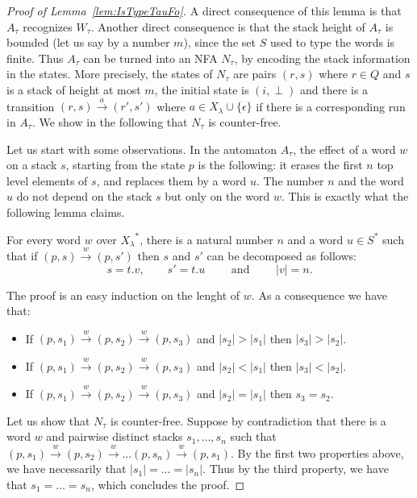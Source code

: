 \begin{proof}[Proof of Lemma~\ref{lem:IsTypeTauFo}]
A direct consequence of this lemma is that $A_\tau$ recognizes $W_\tau$. Another direct consequence is that the stack height of $A_\tau$ is bounded (let us say by a number $m$), since the set $S$ used to type the words is finite. Thus $A_\tau$ can be turned into an NFA $N_\tau$, by encoding the stack information in the states. More precisely, the states of $N_\tau$ are pairs $(r,s)$ where $r\in Q$ and $s$ is a stack of height at most $m$, the initial state is $(i,\perp)$ and there is a transition $(r,s)\xrightarrow{a}(r',s')$ where $a\in X_\lambda\cup\{\epsilon\}$ if there is a corresponding run in $A_\tau$. We show in the following that $N_\tau$ is counter-free. 

Let us start with some observations. In the automaton $A_\tau$, the effect of a word $w$ on a stack $s$, starting from the state $p$ is the following: it erases the first $n$ top level elements of $s$, and replaces them by a word $u$. The number $n$ and the word $u$ do not depend on the stack $s$ but only on the word $w$. This is exactly what the following lemma claims.

\begin{lemma}
For every word $w$ over ${X_\lambda}^*$, there is a natural number $n$ and a word $u\in S^*$ such that if $(p,s)\xrightarrow{w}(p,s')$ then $s$ and $s'$ can be decomposed as follows:
$$s=t.v,\qquad s'=t.u\qquad \text{ and }\qquad |v|=n.$$
\end{lemma}
The proof is an easy induction on the lenght of $w$. As a consequence we have that:
\begin{itemize}
\item If $(p,s_1)\xrightarrow{w}(p,s_2)\xrightarrow{w}(p,s_3)$ and $|s_2|>|s_1|$ then $|s_3|>|s_2|$.
\item If $(p,s_1)\xrightarrow{w}(p,s_2)\xrightarrow{w}(p,s_3)$ and $|s_2|<|s_1|$ then $|s_3|<|s_2|$.
\item If $(p,s_1)\xrightarrow{w}(p,s_2)\xrightarrow{w}(p,s_3)$ and $|s_2|=|s_1|$ then $s_3 =s_2$.
\end{itemize}

Let us show that $N_\tau$ is counter-free. Suppose by contradiction that there is a word $w$ and pairwise distinct stacks $s_1,\dots, s_n$ such that 
$(p,s_1)\xrightarrow{w}(p,s_2)\xrightarrow{w}\dots(p,s_n)\xrightarrow{w}(p,s_1)$. By the first two properties above, we have necessarily that $|s_1|=\dots=|s_n|$. Thus by the third property, we have that $s_1=\dots=s_n$, which concludes the proof.
\end{proof}



